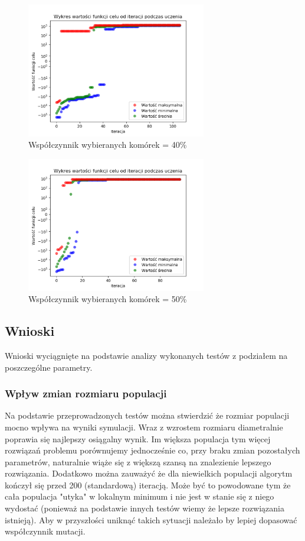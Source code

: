 \documentclass[a4paper]{article}
\begin{document}
\begin{figure}[H]
    \centering
    \includegraphics[width=0.7\textwidth]{plots/selection_40.pdf}
    \caption{Współczynnik wybieranych komórek = 40\%}
    \label{fig:selection_40}
\end{figure}

\begin{figure}[H]
    \centering
    \includegraphics[width=0.7\textwidth]{plots/selection_50.pdf}
    \caption{Współczynnik wybieranych komórek = 50\%}
    \label{fig:selection_50}
\end{figure}


\subsection{Wnioski}
Wnioski wyciągnięte na podstawie analizy wykonanych testów z podziałem na poszczególne parametry.
\subsubsection{Wpływ zmian rozmiaru populacji}
Na podstawie przeprowadzonych testów można stwierdzić że rozmiar populacji mocno wpływa na wyniki symulacji. Wraz z wzrostem rozmiaru diametralnie poprawia się najlepszy osiągalny wynik. Im większa populacja tym więcej rozwiązań problemu porównujemy jednocześnie co, przy braku zmian pozostałych parametrów, naturalnie wiąże się z większą szansą na znalezienie lepszego rozwiązania. Dodatkowo można zauważyć że dla niewielkich populacji algorytm kończył się przed 200 (standardową) iteracją. Może być to powodowane tym że cała populacja "utyka" w lokalnym minimum i nie jest w stanie się z niego wydostać (ponieważ na podstawie innych testów wiemy że lepsze rozwiązania istnieją). Aby w przyszłości uniknąć takich sytuacji należało by lepiej dopasować współczynnik mutacji.
\end{document}
